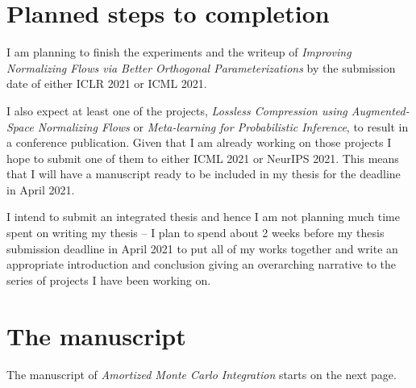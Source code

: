\documentclass[12pt]{article}
\begin{document}
\section{Planned steps to completion}

I am planning to finish the experiments and the writeup of \emph{Improving Normalizing Flows via Better Orthogonal Parameterizations} by the submission date of either ICLR 2021 or ICML 2021.


I also expect at least one of the projects, 
\emph{Lossless Compression using Augmented-Space Normalizing Flows} or
\emph{Meta-learning for Probabilistic Inference},
to result in a conference publication. 
Given that I am already working on those projects I hope to submit one of them to either ICML 2021 or NeurIPS 2021.
This means that I will have a manuscript ready to be included in my thesis for the deadline in April 2021. 

I intend to submit an integrated thesis and hence I am not planning much time spent on writing my thesis --
I plan to spend about 2 weeks before my thesis submission deadline in April 2021 to put all of my works together and 
write an appropriate introduction and conclusion giving an overarching narrative to the series of projects I have been working on.


\section{The manuscript}
The manuscript of \emph{Amortized Monte Carlo Integration} starts on the next page.



 



\end{document}

